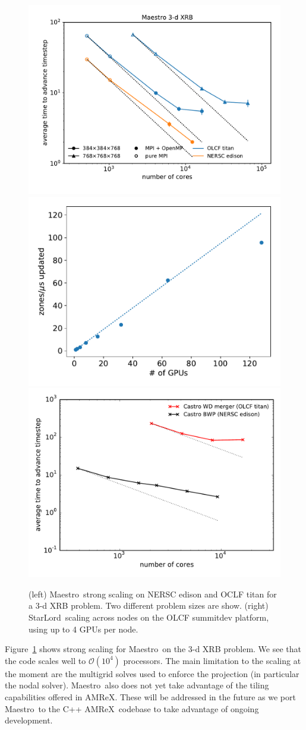 \documentclass[letterpaper]{jpconf}
\newcommand{\maestro}{{\sffamily Maestro}}
\newcommand{\starlord}{{\sffamily StarLord}}
\newcommand{\amrex}{{\sffamily AMReX}}
\begin{document}
\begin{figure}[t]
\centering
\includegraphics[width=0.48\linewidth]{titan_edison_maestro_scaling}
\includegraphics[width=0.48\linewidth]{summitdev_scaling} \\
\includegraphics[width=0.48\linewidth]{castro_scaling}
\caption{\label{fig:scaling} (left) \maestro\ strong scaling on NERSC edison
and OCLF titan for a 3-d XRB problem.  Two different problem sizes are show.
(right) \starlord\ scaling across nodes on the OLCF summitdev platform, using
up to 4 GPUs per node.}
\end{figure}

Figure~\ref{fig:scaling} shows strong scaling for \maestro\ on the 3-d
XRB problem.  We see that the code scales well to $\mathcal{O}(10^4)$
processors.  The main limitation to the scaling at the moment are the
multigrid solves used to enforce the projection (in particular the
nodal solver).  \maestro\ also does not yet take advantage of the
tiling capabilities offered in \amrex.  These will be addressed in the
future as we port \maestro\ to the C++ \amrex\ codebase to take advantage
of ongoing development.
\end{document}
